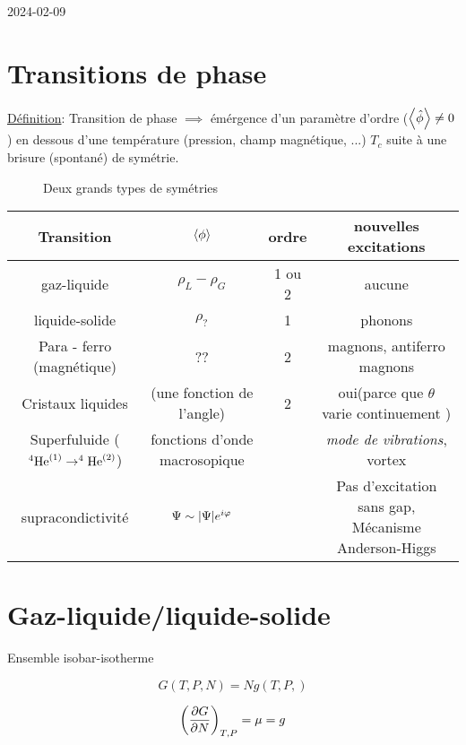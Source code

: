 


2024-02-09


\section*{Transitions de phase}

\underline{Définition}: Transition de phase \(\implies\) émérgence d'un paramètre d'ordre (\(\expval{\hat \phi} \neq 0 \)) en dessous d'une température (pression, champ magnétique, ...) \(T_c\) suite à une brisure (spontané) de symétrie. 

\begin{figure}[ht]
		\centering
		\caption{Deux grands types de symétries}
		\label{fig:deux-grands-types-de-symétries}
\end{figure}

\begin{table}[ht]
	\centering
	\label{tab:transitions}

	\begin{tabular}{c|c|c|c}
		Transition & \(\expval{\phi}\) & ordre & nouvelles excitations\\\hline
		gaz-liquide & \(\rho_L -\rho_G\)& 1 ou 2 & aucune \\\hline
		liquide-solide & $\rho_?$ & 1 & phonons \\\hline
		Para - ferro (magnétique) & ?? & 2 & magnons, antiferro magnons\\\hline
		Cristaux liquides & (une fonction de l'angle)&2 & oui(parce que \(\theta\) varie continuement )\\\hline
		Superfuluide (\(^4 \rm{He}^{(1)} \to ^4 \rm{He}^{(2)}\)) & fonctions d'onde macrosopique & & \textit{mode de vibrations}, vortex \\\hline
		supracondictivité & \(\Psi \sim \abs{\Psi} e^{i\varphi}\) & & Pas d'excitation sans gap, Mécanisme Anderson-Higgs
	\end{tabular}
\end{table}

\section*{Gaz-liquide/liquide-solide}

Ensemble isobar-isotherme

\[ G(T,P,N) = N g(T,P,) \]

\[ \left( \pdv{G}{N}  \right)_{T,P} = \mu = g \]


